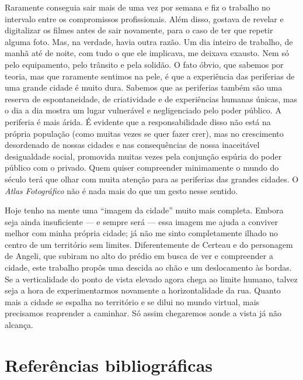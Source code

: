Raramente conseguia sair mais de uma vez por semana e fiz o trabalho no
intervalo entre os compromissos profissionais. Além disso, gostava de
revelar e digitalizar os filmes antes de sair novamente, para o caso de
ter que repetir alguma foto. Mas, na verdade, havia outra razão. Um dia
inteiro de trabalho, de manhã até de noite, com tudo o que ele
implicava, me deixava exausto. Nem só pelo equipamento, pelo trânsito e
pela solidão. O fato óbvio, que sabemos por teoria, mas que raramente
sentimos na pele, é que a experiência das periferias de uma grande
cidade é muito dura. Sabemos que as periferias também são uma reserva de
espontaneidade, de criatividade e de experiências humanas únicas, mas o
dia a dia mostra um lugar vulnerável e negligenciado pelo poder público.
A periferia é mais árida. É evidente que a responsabilidade disso não
está na própria população (como muitas vezes se quer fazer crer), mas no
crescimento desordenado de nossas cidades e nas consequências de nossa
inaceitável desigualdade social, promovida muitas vezes pela conjunção
espúria do poder público com o privado. Quem quiser compreender
minimamente o mundo do século  terá que olhar com muita atenção para
as periferias das grandes cidades. O \emph{Atlas Fotográfico} não é nada
mais do que um gesto nesse sentido.

Hoje tenho na mente uma ``imagem da cidade'' muito mais completa. Embora
seja ainda insuficiente --- e sempre será --- essa imagem me ajuda a
conviver melhor com minha própria cidade; já não me sinto completamente
ilhado no centro de um território sem limites. Diferentemente de Certeau
e do personagem de Angeli, que subiram no alto do prédio em busca de ver
e compreender a cidade, este trabalho propôs uma descida ao chão e um
deslocamento às bordas. Se a verticalidade do ponto de vista elevado
agora chega ao limite humano, talvez seja a hora de experimentarmos
novamente a horizontalidade da rua. Quanto mais a cidade se espalha no
território e se dilui no mundo virtual, mais precisamos reaprender a
caminhar. Só assim chegaremos aonde a vista já não alcança.


\chapter*{Referências bibliográficas}

